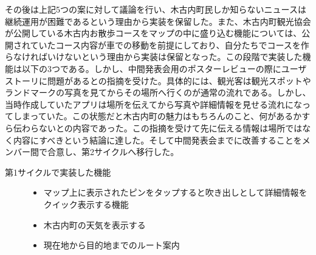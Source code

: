 その後は上記5つの案に対して議論を行い、木古内町民しか知らないニュースは継続運用が困難であるという理由から実装を保留した。また、木古内町観光協会が公開している木古内お散歩コースをマップの中に盛り込む機能については、公開されていたコース内容が車での移動を前提にしており、自分たちでコースを作らなければいけないという理由から実装は保留となった。この段階で実装した機能は以下の3つである。しかし、中間発表会用のポスターレビューの際にユーザストーリに問題があるとの指摘を受けた。具体的には、観光客は観光スポットやランドマークの写真を見てからその場所へ行くのが通常の流れである。しかし、当時作成していたアプリは場所を伝えてから写真や詳細情報を見せる流れになってしまっていた。この状態だと木古内町の魅力はもちろんのこと、何があるかすら伝わらないとの内容であった。この指摘を受けて先に伝える情報は場所ではなく内容にすべきという結論に達した。そして中間発表会までに改善することをメンバー間で合意し、第2サイクルへ移行した。
\begin{description}
\item[第1サイクルで実装した機能]\mbox{}
\begin{itemize}
 \item マップ上に表示されたピンをタップすると吹き出しとして詳細情報をクイック表示する機能
 \item 木古内町の天気を表示する
 \item 現在地から目的地までのルート案内
\end{itemize}
\end{description}
